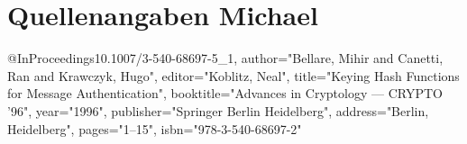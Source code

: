 \section{Quellenangaben Michael}
@InProceedings{10.1007/3-540-68697-5_1,
author="Bellare, Mihir
and Canetti, Ran
and Krawczyk, Hugo",
editor="Koblitz, Neal",
title="Keying Hash Functions for Message Authentication",
booktitle="Advances in Cryptology --- CRYPTO '96",
year="1996",
publisher="Springer Berlin Heidelberg",
address="Berlin, Heidelberg",
pages="1--15",
isbn="978-3-540-68697-2"
}